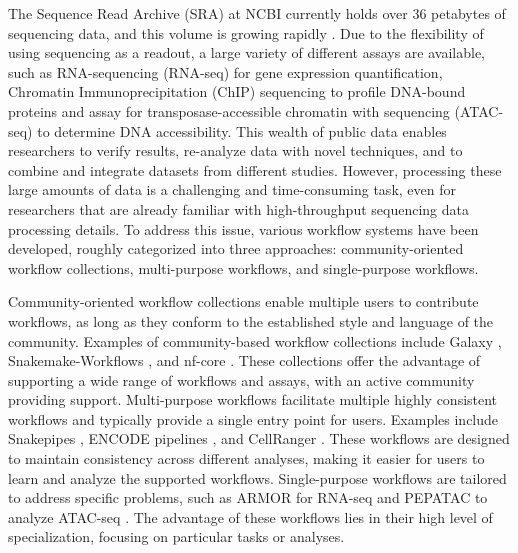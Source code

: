The Sequence Read Archive (SRA) at NCBI currently holds over 36 petabytes of sequencing data, and this volume is growing rapidly \cite{srawebsite}. Due to the flexibility of using sequencing as a readout, a large variety of different assays are available, such as RNA-sequencing (RNA-seq) \cite{rnaseq} for gene expression quantification, Chromatin Immunoprecipitation (ChIP) sequencing \cite{chipseq} to profile DNA-bound proteins and assay for transposase-accessible chromatin with sequencing (ATAC-seq) \cite{atacseq} to determine DNA accessibility. This wealth of public data enables researchers to verify results, re-analyze data with novel techniques, and to combine and integrate datasets from different studies. However, processing these large amounts of data is a challenging and time-consuming task, even for researchers that are already familiar with high-throughput sequencing data processing details. To address this issue, various workflow systems have been developed, roughly categorized into three approaches: community-oriented workflow collections, multi-purpose workflows, and single-purpose workflows.

Community-oriented workflow collections enable multiple users to contribute workflows, as long as they conform to the established style and language of the community. Examples of community-based workflow collections include Galaxy \cite{galaxy}, Snakemake-Workflows \cite{snakemakeworkflows}, and nf-core \cite{nfcore}. These collections offer the advantage of supporting a wide range of workflows and assays, with an active community providing support. Multi-purpose workflows facilitate multiple highly consistent workflows and typically provide a single entry point for users. Examples include Snakepipes \cite{snakepipes}, ENCODE pipelines \cite{encode2023}, and CellRanger \cite{Zheng2017}. These workflows are designed to maintain consistency across different analyses, making it easier for users to learn and analyze the supported workflows. Single-purpose workflows are tailored to address specific problems, such as ARMOR for RNA-seq \cite{Orjuela2019} and PEPATAC to analyze ATAC-seq \cite{Smith2021}. The advantage of these workflows lies in their high level of specialization, focusing on particular tasks or analyses.

